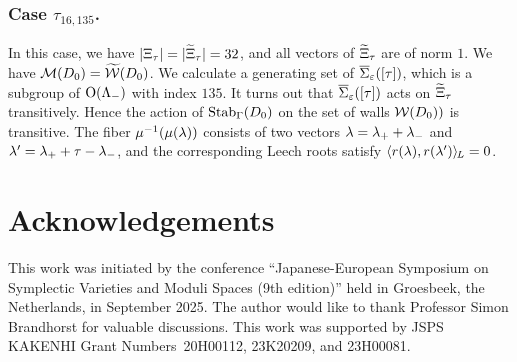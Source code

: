 \documentclass{amsart} %
\begin{document}
\subsubsection{Case $\tau_{16, 135}$.}
In this case,
we have $|\Xi_{\tau}|=|\widetilde{\Xi}_{\tau}|=32$,
and all vectors of $\widetilde{\Xi}_{\tau}$ are of norm $1$.
We have $\mathord{\mathcal{M}}(D_0)=\widetilde{\mathord{\mathcal{W}}}(D_0)$.
We calculate a generating set of $\overline{\Sigma}_{\varepsilon} ([\tau])$,
which is a subgroup of $ \mathord{\mathrm{O}}(\Lambda_{-})$ with index $135$.
It turns out that $\overline{\Sigma}_{\varepsilon} ([\tau])$ acts on $\widetilde{\Xi}_{\tau}$ transitively.
Hence the action of $\operatorname{Stab}_{\Gamma}(D_0)$ on the set of walls $\mathord{\mathcal{W}}(D_0))$ is transitive.
The fiber 
 $\mu^{-1}(\mu(\lambda))$ 
consists of two vectors
$\lambda={\lambda}_{+}+{\lambda}_{-}$ and $\lambda^{\prime}={\lambda}_{+}+\tau-{\lambda}_{-}$, and 
the corresponding Leech roots 
 satisfy
$\langle r(\lambda), r(\lambda^{\prime}) \rangle_{\hskip -1pt L}=0$.
%
 
\section*{Acknowledgements}
This work was initiated by the conference 
``Japanese-European Symposium on Symplectic Varieties and Moduli Spaces (9th edition)''
held in Groesbeek, the Netherlands,  in September 2025.
The author would like to thank Professor Simon Brandhorst for valuable discussions.
This work was supported by JSPS KAKENHI Grant Numbers~20H00112, 23K20209, and 23H00081.

 
%
%



%
\end{document}
